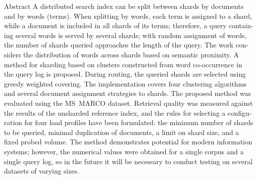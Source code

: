 \documentclass[10pt, a4paper, twoside]{article}
\begin{document}
\vspace{14pt}
\begin{otherlanguage}{english}
\begin{ntvabstract}{Abstract}
A distributed search index can be split between shards by documents and by words (terms).
When splitting by words, each term is assigned to a shard, while a document is included in all shards of its terms; therefore, a query containing several words is served by several shards; with random assignment of words, the number of shards queried approaches the length of the query.
The work considers the distribution of words across shards based on semantic proximity.
A method for sharding based on clusters constructed from word co-occurrence in the query log is proposed.
During routing, the queried shards are selected using greedy weighted covering.
The implementation covers four clustering algorithms and several document assignment strategies to shards.
The proposed method was evaluated using the MS~MARCO dataset.
Retrieval quality was measured against the results of the unsharded reference index, and the rules for selecting a configuration for four load profiles have been formulated: the minimum number of shards to be queried, minimal duplication of documents, a limit on shard size, and a fixed probed volume.
The method demonstrates potential for modern information systems; however, the numerical values were obtained for a single corpus and a single query log, so in the future it will be necessary to conduct testing on several datasets of varying sizes.
\end{ntvabstract}
\end{otherlanguage}
\end{document}
